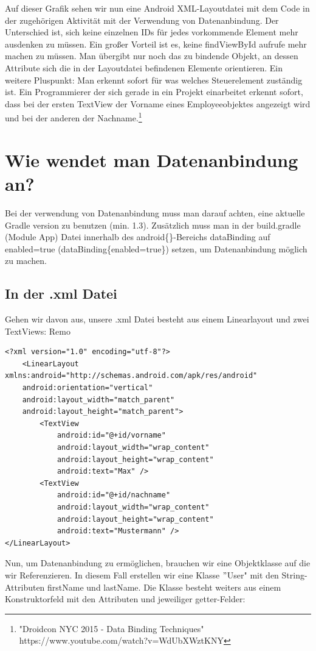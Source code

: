 \documentclass[a4paper,12pt]{article}
\begin{document}
Auf dieser Grafik sehen wir nun eine Android XML-Layoutdatei mit dem Code in der zugehörigen Aktivität mit der Verwendung von Datenanbindung. Der Unterschied ist, sich keine einzelnen IDs für jedes vorkommende Element mehr ausdenken zu müssen. Ein großer Vorteil ist es, keine findViewById aufrufe mehr machen zu müssen. Man übergibt nur noch das zu bindende Objekt, an dessen Attribute sich die in der Layoutdatei befindenen Elemente orientieren. 
Ein weitere Pluspunkt: Man erkennt sofort für was welches Steuerelement zuständig ist. Ein Programmierer der sich gerade in ein Projekt einarbeitet erkennt sofort, dass bei der ersten TextView der Vorname eines Employeeobjektes angezeigt wird und bei der anderen der Nachname.\footnote{"Droidcon NYC 2015 - Data Binding Techniques" \\ https://www.youtube.com/watch?v=WdUbXWztKNY}

\section{Wie wendet man Datenanbindung an?}
Bei der verwendung von Datenanbindung muss man darauf achten, eine aktuelle Gradle version zu benutzen (min. 1.3). Zusätzlich muss man in der build.gradle (Module App) Datei innerhalb des android\{\}-Bereichs dataBinding auf enabled=true (dataBinding\{enabled=true\}) setzen, um Datenanbindung möglich zu machen.
\subsection{In der .xml Datei}
Gehen wir davon aus, unsere .xml Datei besteht aus einem Linearlayout und zwei TextViews: Remo

\begin{lstlisting}[caption={Layoutcode ohne jedliche Datenanbindung.},label=DescriptiveLabel]
<?xml version="1.0" encoding="utf-8"?>
	<LinearLayout xmlns:android="http://schemas.android.com/apk/res/android"
	android:orientation="vertical"
	android:layout_width="match_parent"
	android:layout_height="match_parent">
		<TextView
			android:id="@+id/vorname"
			android:layout_width="wrap_content"
			android:layout_height="wrap_content"
			android:text="Max" />
		<TextView
			android:id="@+id/nachname"
			android:layout_width="wrap_content"
			android:layout_height="wrap_content"
			android:text="Mustermann" />
</LinearLayout>

\end{lstlisting}

Nun, um Datenanbindung zu ermöglichen, brauchen wir eine Objektklasse auf die wir Referenzieren. In diesem Fall erstellen wir eine Klasse $"$User" mit den String-Attributen firstName und lastName. Die Klasse besteht weiters aus einem Konstruktorfeld mit den Attributen und jeweiliger getter-Felder: 
\end{document}
